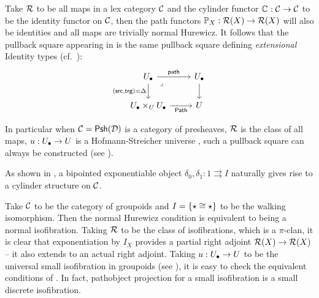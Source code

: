 \begin{example}\label{example:sets}
  Take $\RR$ to be all maps in a lex category $\CC$
  and the cylinder functor $\cyl : \CC \to \CC$
  to be the identity functor on $\CC$, 
  then the path functors $\arr[X] : \RR(X) \to \RR(X)$
  will also be identities
  and all maps are trivially normal Hurewicz.
  It follows that the pullback square appearing in 
  is the same pullback square defining \emph{extensional} Identity types (cf.~\cite{awodey2025}):
  \[ \begin{tikzcd}
        \Ulow & \Ulow \\
        {\Ulow \times_\U \Ulow} & \U
        \arrow["\path", from=1-1, to=1-2]
        \arrow["{{(\src,\trg) = \Delta}}"', from=1-1, to=2-1]
        \arrow["\lrcorner"{anchor=center, pos=0.125}, draw=none, from=1-1, to=2-2]
        \arrow[from=1-2, to=2-2]
        \arrow["\Path"', from=2-1, to=2-2]
    \end{tikzcd} \]

  In particular when $\CC = \Psh(\DD)$ is a category of presheaves,
  $\RR$ is the class of all maps,
  $\uu : \Ulow \to U$ is a Hofmann-Streicher universe \cite{hofmann1997},
  such a pullback square can always be constructed (see \cite[Section {7.1}]{awodey2026}).
\end{example}

As shown in ,
a bipointed exponentiable object
$\delta_0, \delta_1 : 1 \rightrightarrows I$
naturally gives rise to a cylinder structure on $\CC$.

\begin{example}\label{example:groupoids}
  Take $\CC$ to be the category of groupoids
  and $I = \{\star \iso \star\}$ to be the walking isomorphism.
  Then the normal Hurewicz condition is equivalent to being a normal isofibration.
  Taking $\RR$ to be the class of isofibrations,
  which is a $\pi$-clan,
  it is clear that exponentiation by $I_X$ provides a partial right adjoint
  $\RR(X) \to \RR(X)$ -- it also extends to an actual right adjoint.
  Taking $\uu : \Ulow \to \U$ to be the universal small isofibration in groupoids
  (see ),
  it is easy to check the equivalent conditions of .
  In fact, pathobject projection for a small isofibration
  is a small discrete isofibration.
\end{example}

